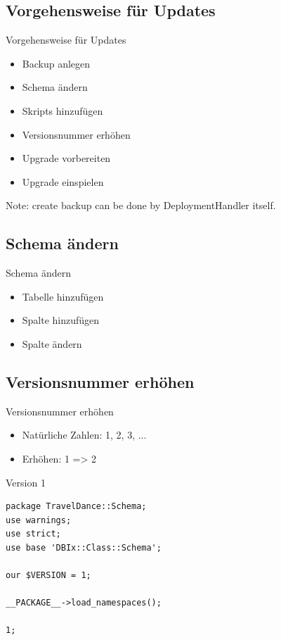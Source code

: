 \subsection{Vorgehensweise für Updates}

\begin{frame}{Vorgehensweise für Updates}
\begin{itemize}
\item Backup anlegen
\item Schema ändern
\item Skripts hinzufügen
\item Versionsnummer erhöhen
\item Upgrade vorbereiten
\item Upgrade einspielen
\end{itemize}
\end{frame}

Note: create backup can be done by DeploymentHandler itself.

\subsection{Schema ändern}

\begin{frame}{Schema ändern}
\begin{itemize}
\item Tabelle hinzufügen
\item Spalte hinzufügen
\item Spalte ändern
\end{itemize}
\end{frame}

\subsection{Versionsnummer erhöhen}
\begin{frame}{Versionsnummer erhöhen}
\begin{itemize}
\item Natürliche Zahlen: 1, 2, 3, ...
\item Erhöhen: 1 => 2
\end{itemize}
\end{frame}

\begin{frame}[fragile]{Version 1}
\begin{lstlisting}
package TravelDance::Schema;
use warnings;
use strict;
use base 'DBIx::Class::Schema';

our $VERSION = 1;

__PACKAGE__->load_namespaces();

1;
\end{lstlisting}
\end{frame}

